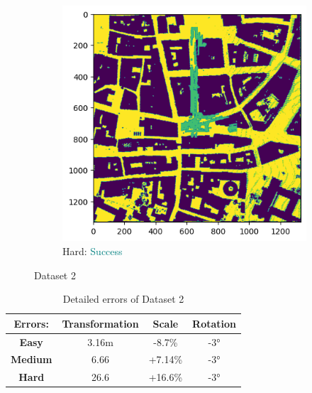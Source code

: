 \documentclass[11pt]{article}
\begin{document}
\begin{figure}[p]
        \vspace{1em}

        \begin{subfigure}{0.45\textwidth}
            \centering
            \includegraphics[width=\linewidth]{images/full/hard/4_1_3_hard}
            \caption{Hard: \textcolor{teal}{Success}}
            \label{fig:4_1_3_hard}
        \end{subfigure}
        \hfill

        \caption{Dataset 2}
        \label{fig:res_4_1_3}
    \end{figure}

    \begin{table}[p]
        \centering
        \begin{tabular}{|c|c|c|c|}
          \hline
          \textbf{Errors:} & \textbf{Transformation} & \textbf{Scale} & \textbf{Rotation} \\
          \hline
          \textbf{Easy}   & 3.16m & -8.7\%  & -3° \\
          \hline
          \textbf{Medium} & 6.66  & +7.14\% & -3° \\
          \hline
          \textbf{Hard}   & 26.6  & +16.6\% & -3° \\
          \hline
        \end{tabular}
        \caption{Detailed errors of Dataset 2}
        \label{tab:tab_2}
    \end{table}
\end{document}
